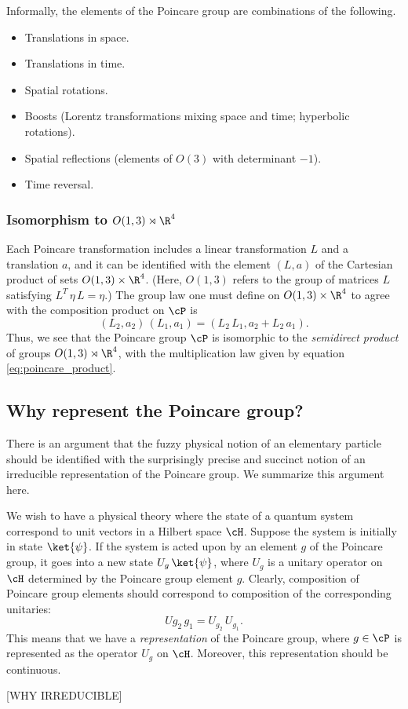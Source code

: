 Informally, the elements of the Poincare group are combinations of the following.
\begin{itemize}
    \item Translations in space.
    \item Translations in time.
    \item Spatial rotations.
    \item Boosts (Lorentz transformations mixing space and time; hyperbolic rotations).
    \item Spatial reflections (elements of $O(3)$ with determinant $-1$).
    \item Time reversal.
\end{itemize}

\subsubsection{Isomorphism to $O(1, 3) \rtimes \R^4$}
Each Poincare transformation includes a linear transformation $L$ and a translation $a$, and it can be identified with the element $(L, a)$ of the Cartesian product of sets $O(1, 3) \times \R^4$. (Here, $O(1, 3)$ refers to the group of matrices $L$ satisfying $L^T \, \eta \, L = \eta$.) The group law one must define on $O(1, 3) \times \R^4$ to agree with the composition product on $\cP$ is
\begin{equation} \label{eq:poincare_product}
    (L_2, a_2) \, (L_1, a_1) = (L_2 \, L_1, a_2 + L_2 \, a_1).
\end{equation}
Thus, we see that the Poincare group $\cP$ is isomorphic to the \emph{semidirect product} of groups $O(1, 3) \rtimes \R^4$, with the multiplication law given by equation \ref{eq:poincare_product}.


\subsection{Why represent the Poincare group?}
There is an argument that the fuzzy physical notion of an elementary particle should be identified with the surprisingly precise and succinct notion of an irreducible representation of the Poincare group. We summarize this argument here.

We wish to have a physical theory where the state of a quantum system correspond to unit vectors in a Hilbert space $\cH$. Suppose the system is initially in state $\ket{\psi}$. If the system is acted upon by an element $g$ of the Poincare group, it goes into a new state $U_g \, \ket{\psi}$, where $U_g$ is a unitary operator on $\cH$ determined by the Poincare group element $g$. Clearly, composition of Poincare group elements should correspond to composition of the corresponding unitaries:
\begin{equation*}
    U{g_2 \, g_1} = U_{g_2} \, U_{g_1}.
\end{equation*}
This means that we have a \emph{representation} of the Poincare group, where $g \in \cP$ is represented as the operator $U_g$ on $\cH$. Moreover, this representation should be continuous.

[WHY IRREDUCIBLE]

